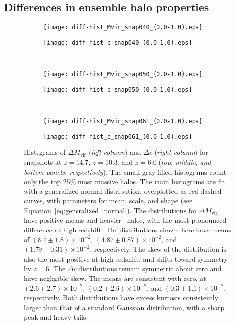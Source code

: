 \subsection{Differences in ensemble halo properties}


\begin{figure*}[tp]
	\centering
	\begin{subfigure}{}
		\texttt{[image: diff-hist\_Mvir\_snap040\_(0.0-1.0).eps]}
	\end{subfigure}
	\begin{subfigure}{}
		\texttt{[image: diff-hist\_c\_snap040\_(0.0-1.0).eps]}
	\end{subfigure}
	\\
	\begin{subfigure}{}
		\texttt{[image: diff-hist\_Mvir\_snap050\_(0.0-1.0).eps]}
	\end{subfigure}
	\begin{subfigure}{}
		\texttt{[image: diff-hist\_c\_snap050\_(0.0-1.0).eps]}
	\end{subfigure}
	\\
	\begin{subfigure}{}
		\texttt{[image: diff-hist\_Mvir\_snap061\_(0.0-1.0).eps]}
	\end{subfigure}
	\begin{subfigure}{}
		\texttt{[image: diff-hist\_c\_snap061\_(0.0-1.0).eps]}
	\end{subfigure}
	\caption[Histograms of $\Delta M_{\mathrm{vir}}$ and $\Delta c$]{\footnotesize Histograms of $\Delta M_{\mathrm{vir}}$ (\textit{left column}) and $\Delta c$ (\textit{right column}) for snapshots at $z = 14.7$, $z = 10.3$, and $z = 6.0$ (\textit{top, middle, and bottom panels, respectively}).  The small gray-filled histograms count only the top 25\% most massive halos.  The main histograms are fit with a generalized normal distribution, overplotted as red dashed curves, with parameters for mean, scale, and shape (see Equation~\ref{eq:generalized_normal}).  The distributions for $\Delta M_{\mathrm{vir}}$ have positive means and heavier \lpt\ halos, with the most pronounced difference at high redshift.  The distributions shown here have means of $(8.4 \pm 1.8) \times 10^{-2}$, $(4.87 \pm 0.87) \times 10^{-2}$, and $(1.79 \pm 0.31) \times 10^{-2}$, respectively.  The skew of the distribution is also the most positive at high redshift, and shifts toward symmetry by $z = 6$.  The $\Delta c$ distributions remain symmetric about zero and have negligible skew.  The means are consistent with zero, at $(2.6 \pm 2.7) \times 10^{-2}$, $(0.2 \pm 2.6) \times 10^{-2}$, and $(0.3 \pm 1.1) \times 10^{-2}$, respectively.  Both distributions have excess kurtosis consistently larger than that of a standard Gaussian distribution, with a sharp peak and heavy tails.}
	\label{fig:diff-hist}
\end{figure*}

